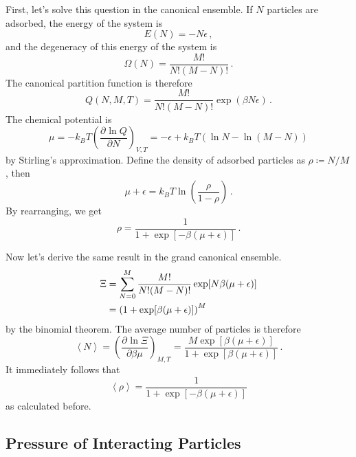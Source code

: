 \documentclass{article}
\theoremstyle{plain}\theoremheaderfont{\normalfont\bfseries}\theorembodyfont{\rmfamily}\theoremseparator{.}\newtheorem*{thm}{Theorem}\newtheorem*{law}{Law}\newtheorem*{pos}{Postulate}
\numberwithin{equation}{section}
\newcommand{\pdv}[3][]{\frac{\partial^{#1} #2}{{\partial #3}^{#1}}}
\newcommand{\eval}[1]{\left\langle #1 \right\rangle}
\begin{document}
    First, let's solve this question in the canonical ensemble. If \(N\) particles are adsorbed, the energy of the system is
    \begin{equation}
        E(N)=-N\epsilon\,,
    \end{equation}
    and the degeneracy of this energy of the system is
    \begin{equation}
        \Omega(N)=\frac{M!}{N!(M-N)!}\,.
    \end{equation}
    The canonical partition function is therefore
    \begin{equation}
        Q(N,M,T)=\frac{M!}{N!(M-N)!}\exp(\beta N\epsilon)\,.
    \end{equation}
    The chemical potential is
    \begin{equation}
        \mu=-k_B T\left(\pdv{\ln Q}{N}\right)_{V,T}=-\epsilon+k_B T(\ln N-\ln(M-N))
    \end{equation}
    by Stirling's approximation. Define the density of adsorbed particles as \(\rho\coloneqq N/M\), then
    \begin{equation}
        \mu +\epsilon=k_B T\ln\left(\frac{\rho}{1-\rho}\right)\,.
    \end{equation}
    By rearranging, we get
    \begin{equation}
        \rho=\frac{1}{1+\exp[-\beta(\mu+\epsilon)]}\,.
    \end{equation}

    Now let's derive the same result in the grand canonical ensemble.
    \begin{align}
        \Xi&=\sum_{N=0}^{M}\frac{M!}{N!(M-N)!}\exp[N\beta(\mu+\epsilon)]\notag\\
        &=\left(1+\exp[\beta(\mu+\epsilon)]\right)^M
    \end{align}
    by the binomial theorem. The average number of particles is therefore
    \begin{equation}
        \eval{N}=\left(\pdv{\ln\Xi}{\beta\mu}\right)_{M,T}=\frac{M\exp[\beta(\mu+\epsilon)]}{1+\exp[\beta(\mu+\epsilon)]}\,.
    \end{equation}
    It immediately follows that
    \begin{equation}
        \eval{\rho}=\frac{1}{1+\exp[-\beta(\mu+\epsilon)]}
    \end{equation}
    as calculated before.
    \subsection{Pressure of Interacting Particles}
\end{document}
